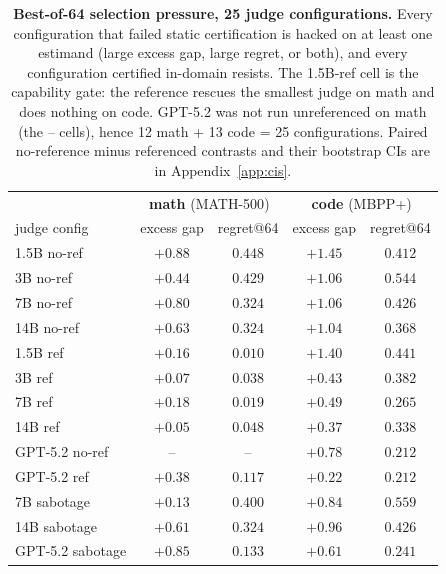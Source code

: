 \documentclass[11pt]{article}
\begin{document}
\begin{table}[t]
\centering
\small
\begin{tabular}{lcc@{\qquad}cc}
\toprule
& \multicolumn{2}{c}{\textbf{math} (\textsc{MATH-500})} & \multicolumn{2}{c}{\textbf{code} (\textsc{MBPP+})} \\
judge config & excess gap & regret@64 & excess gap & regret@64 \\
\midrule
1.5B no-ref & $+0.88$ & $0.448$ & $+1.45$ & $0.412$ \\
3B no-ref & $+0.44$ & $0.429$ & $+1.06$ & $0.544$ \\
7B no-ref & $+0.80$ & $0.324$ & $+1.06$ & $0.426$ \\
14B no-ref & $+0.63$ & $0.324$ & $+1.04$ & $0.368$ \\
\midrule
1.5B ref & $+0.16$ & $\mathbf{0.010}$ & $+1.40$ & $0.441$ \\
3B ref & $+0.07$ & $0.038$ & $+0.43$ & $0.382$ \\
7B ref & $+0.18$ & $0.019$ & $+0.49$ & $0.265$ \\
14B ref & $+0.05$ & $0.048$ & $+0.37$ & $0.338$ \\
\midrule
GPT-5.2 no-ref & -- & -- & $+0.78$ & $0.212$ \\
GPT-5.2 ref & $+0.38$ & $0.117$ & $+0.22$ & $0.212$ \\
\midrule
7B sabotage & $+0.13$ & $0.400$ & $+0.84$ & $0.559$ \\
14B sabotage & $+0.61$ & $0.324$ & $+0.96$ & $0.426$ \\
GPT-5.2 sabotage & $+0.85$ & $0.133$ & $+0.61$ & $0.241$ \\
\bottomrule
\end{tabular}
\caption{\textbf{Best-of-64 selection pressure, 25 judge configurations.}
Every configuration that failed static certification is hacked on at least one estimand (large excess gap, large regret, or both), and every configuration certified in-domain resists.
The 1.5B-ref cell is the capability gate: the reference rescues the smallest judge on math and does nothing on code.
GPT-5.2 was not run unreferenced on math (the -- cells), hence 12 math + 13 code = 25 configurations.
Paired no-reference minus referenced contrasts and their bootstrap CIs are in Appendix~\ref{app:cis}.}
\label{tab:bon}
\end{table}
\end{document}
